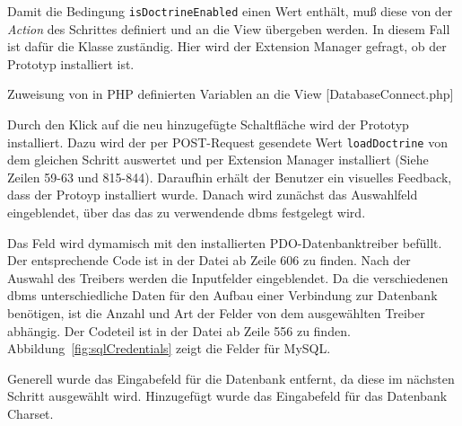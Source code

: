 Damit die Bedingung \texttt{isDoctrineEnabled} einen Wert enthält, muß diese von der \textit{Action} des Schrittes definiert und an die View übergeben werden. In diesem Fall ist dafür die Klasse  zuständig. Hier wird der Extension Manager gefragt, ob der Prototyp installiert ist.

\begin{listing}
\caption{Zuweisung von in PHP definierten Variablen an die View [DatabaseConnect.php]}
\end{listing}

Durch den Klick auf die neu hinzugefügte Schaltfläche wird der Prototyp installiert. Dazu wird der per POST-Request gesendete Wert \texttt{loadDoctrine} von dem gleichen Schritt auswertet und per Extension Manager installiert (Siehe  Zeilen 59-63 und 815-844). Daraufhin erhält der Benutzer ein visuelles Feedback, dass der Protoyp installiert wurde. Danach wird zunächst das  Auswahlfeld eingeblendet, über das das zu verwendende \gls{dbms} festgelegt wird.

Das Feld wird dymamisch mit den installierten PDO-Datenbanktreiber befüllt. Der entsprechende Code ist in der Datei  ab Zeile 606 zu finden. Nach der Auswahl des Treibers werden die Inputfelder eingeblendet. Da die verschiedenen \gls{dbms} unterschiedliche Daten für den Aufbau einer Verbindung zur Datenbank benötigen, ist die Anzahl und Art der Felder von dem ausgewählten Treiber abhängig. Der Codeteil ist in der Datei  ab Zeile 556 zu finden. Abbildung~\ref{fig:sqlCredentials} zeigt die  Felder für MySQL.

Generell wurde das Eingabefeld für die Datenbank entfernt, da diese im nächsten Schritt ausgewählt wird. Hinzugefügt wurde das Eingabefeld für das Datenbank Charset.

